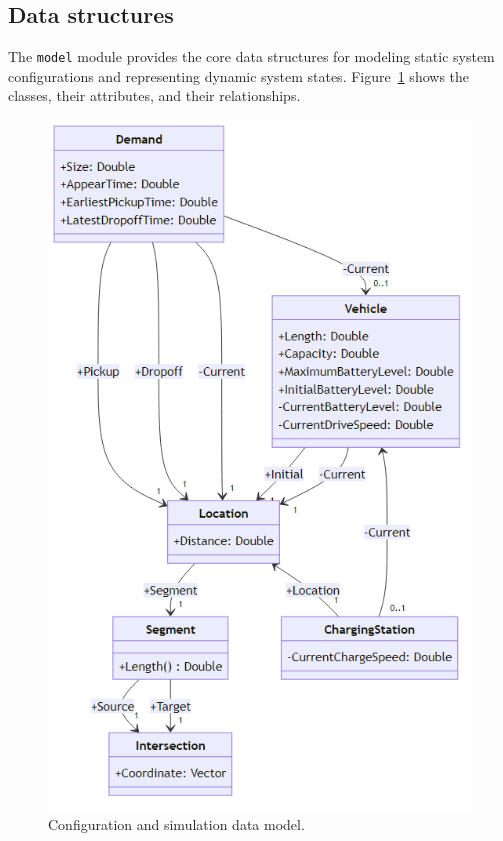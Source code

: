 \documentclass[10pt,twocolumn]{article}
\begin{document}
\subsection{Data structures}
\label{sec:data-model}

The \texttt{model} module provides the core data structures for modeling static system configurations and representing dynamic system states.
Figure~\ref{fig:data-model} shows the classes, their attributes, and their relationships.

\begin{figure}[!ht]
    \centering
    \includegraphics[scale=0.4]{../../diagrams/model/classes-v0.2.png}
    \caption{Configuration and simulation data model.}
    \label{fig:data-model}
\end{figure}
\end{document}

